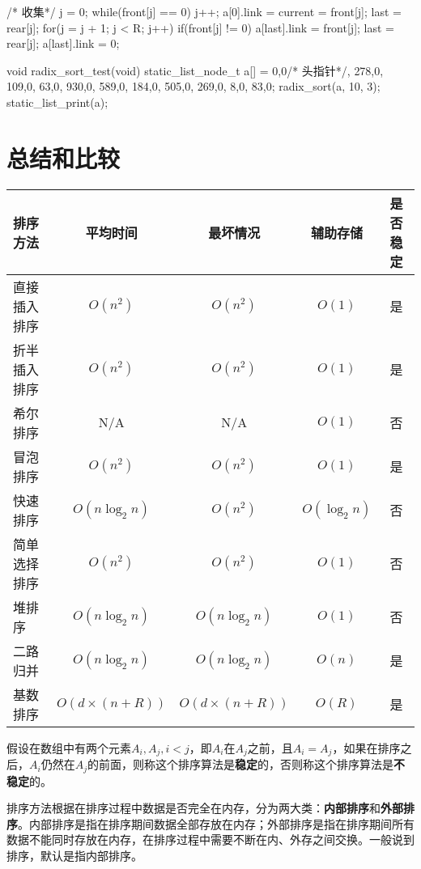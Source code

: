\begin{Codex}[label=radix_sort.c]
{{        /* 收集*/
        j = 0;
        while(front[j] == 0) j++;
        a[0].link = current = front[j];
        last = rear[j];
        for(j = j + 1; j < R; j++) {
            if(front[j] != 0) {
                a[last].link = front[j];
                last = rear[j];
            }
        }
        a[last].link = 0;
    }
}

void radix_sort_test(void) {
    static_list_node_t a[] = {{0,0}/* 头指针*/, {278,0}, {109,0}, 
    {63,0}, {930,0}, {589,0}, {184,0}, {505,0}, {269,0}, 
    {8,0}, {83,0}};
    radix_sort(a, 10, 3);
    static_list_print(a);
}
\end{Codex}


\section{总结和比较} %

\begin{center}

\vspace{1ex}
\begin{tabular}{lcccc}
\hline
\textbf{排序方法} & \textbf{平均时间} & \textbf{最坏情况} & \textbf{辅助存储} & \textbf{是否稳定}\\
\hline
直接插入排序 & $O(n^2)$ & $O(n^2)$ & $O(1)$ & 是\\
折半插入排序 & $O(n^2)$ & $O(n^2)$ & $O(1)$ & 是\\
希尔排序 & N/A & N/A & $O(1)$ & 否\\
冒泡排序 & $O(n^2)$ & $O(n^2)$ & $O(1)$ & 是\\
快速排序 & $O(n\log_2n)$ & $O(n^2)$ & $O(\log_2n)$ & 否\\
简单选择排序 & $O(n^2)$ & $O(n^2)$ & $O(1)$ & 否\\
堆排序 & $O(n\log_2n)$ & $O(n\log_2n)$ & $O(1)$ & 否\\
二路归并 & $O(n\log_2n)$ & $O(n\log_2n)$ & $O(n)$ & 是\\
基数排序 & $O(d\times (n+R))$ & $O(d\times (n+R))$ & $O(R)$ & 是\\
\hline
\end{tabular}
\end{center}

假设在数组中有两个元素$A_i,A_j,i<j$，即$A_i$在$A_j$之前，且$A_i=A_j$，如果在排序之后，$A_i$仍然在$A_j$的前面，则称这个排序算法是\textbf{稳定}的，否则称这个排序算法是\textbf{不稳定}的。

排序方法根据在排序过程中数据是否完全在内存，分为两大类：\textbf{内部排序}和\textbf{外部排序}。内部排序是指在排序期间数据全部存放在内存；外部排序是指在排序期间所有数据不能同时存放在内存，在排序过程中需要不断在内、外存之间交换。一般说到排序，默认是指内部排序。


